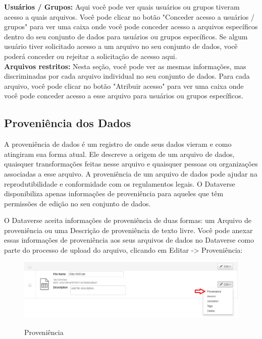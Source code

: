 \documentclass[12pt,hidelinks]{article}
\begin{document}
\textbf{Usuários / Grupos:} Aqui você pode ver quais usuários ou grupos tiveram acesso a quais arquivos. Você pode clicar no botão "Conceder acesso a usuários / grupos" para ver uma caixa onde você pode conceder acesso a arquivos específicos dentro do seu conjunto de dados para usuários ou grupos específicos. Se algum usuário tiver solicitado acesso a um arquivo no seu conjunto de dados, você poderá conceder ou rejeitar a solicitação de acesso aqui.\\

\textbf{Arquivos restritos:} Nesta seção, você pode ver as mesmas informações, mas discriminadas por cada arquivo individual no seu conjunto de dados. Para cada arquivo, você pode clicar no botão "Atribuir acesso" para ver uma caixa onde você pode conceder acesso a esse arquivo para usuários ou grupos específicos.
        
    \subsection{Proveniência dos Dados}
    
\qquad A proveniência de dados é um registro de onde seus dados vieram e como atingiram sua forma atual. Ele descreve a origem de um arquivo de dados, quaisquer transformações feitas nesse arquivo e quaisquer pessoas ou organizações associadas a esse arquivo. A proveniência de um arquivo de dados pode ajudar na reprodutibilidade e conformidade com os regulamentos legais. O Dataverse disponibiliza apenas informações de proveniência para aqueles que têm permissões de edição no seu conjunto de dados.

O Dataverse aceita informações de proveniência de duas formas: um Arquivo de proveniência ou uma Descrição de proveniência de texto livre. Você pode anexar essas informações de proveniência aos seus arquivos de dados no Dataverse como parte do processo de upload do arquivo, clicando em Editar -> Proveniência:
   
  \begin{figure}[H]
     \caption{Proveniência}
                \centering
         \includegraphics[scale=0.5]{prov.png}
            \label{Proveniência}
        \end{figure}
   \\
\end{document}
